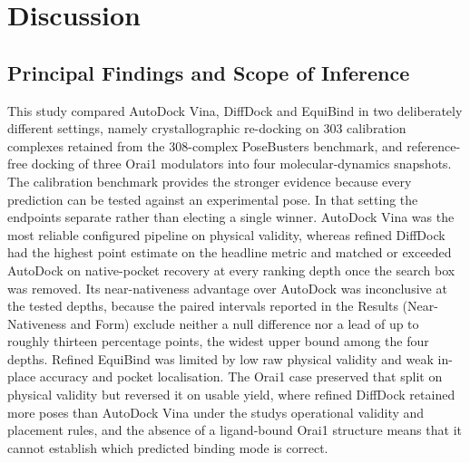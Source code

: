 \hypertarget{discussion}{%
\chapter{\texorpdfstring{Discussion }{Discussion }}\label{discussion}}

\hypertarget{principal-findings-and-scope-of-inference}{%
\section{Principal Findings and Scope of Inference}\label{principal-findings-and-scope-of-inference}}

This study compared AutoDock Vina, DiffDock and EquiBind in two deliberately different settings, namely crystallographic re-docking on 303 calibration complexes retained from the 308-complex PoseBusters benchmark, and reference-free docking of three Orai1 modulators into four molecular-dynamics snapshots. The calibration benchmark provides the stronger evidence because every prediction can be tested against an experimental pose. In that setting the endpoints separate rather than electing a single winner. AutoDock Vina was the most reliable configured pipeline on physical validity, whereas refined DiffDock had the highest point estimate on the headline metric and matched or exceeded AutoDock on native-pocket recovery at every ranking depth once the search box was removed. Its near-nativeness advantage over AutoDock was inconclusive at the tested depths, because the paired intervals reported in the Results (Near-Nativeness and Form) exclude neither a null difference nor a lead of up to roughly thirteen percentage points, the widest upper bound among the four depths. Refined EquiBind was limited by low raw physical validity and weak in-place accuracy and pocket localisation. The Orai1 case preserved that split on physical validity but reversed it on usable yield, where refined DiffDock retained more poses than AutoDock Vina under the study\textquotesingle s operational validity and placement rules, and the absence of a ligand-bound Orai1 structure means that it cannot establish which predicted binding mode is correct.


